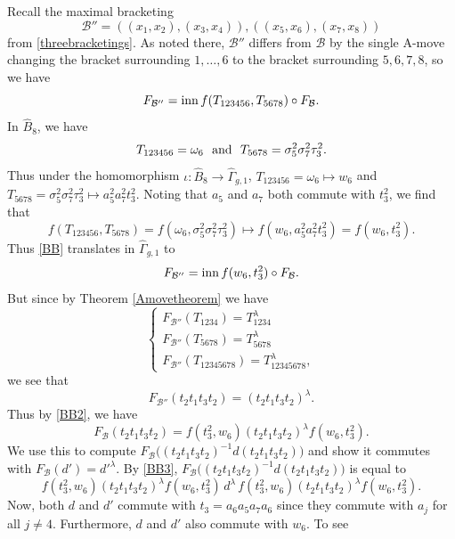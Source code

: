 \documentclass[a4paper,10pt,reqno]{amsart}
\newcommand\B{\widehat{B}}
\newcommand\GGone{\widehat{\Gamma}_{g,1}}
\begin{document}
Recall the maximal bracketing
$${\mathcal{B}''}=((x_1,x_2),(x_3,x_4)),((x_5,x_6),(x_7,x_8))$$
from \eqref{threebracketings}. As noted there, ${\mathcal{B}''}$ differs from
${\mathcal{B}}$ by the single A-move changing the bracket surrounding $1,\ldots,6$ to the
bracket surrounding $5,6,7,8$, so we have
\begin{equation}\label{BB}
F_{\mathcal{B}''}={\rm inn}\,f(T_{123456},T_{5678})\circ F_{\mathcal{B}}.
\end{equation}
In $\B_8$, we have
$$T_{123456}=\omega_6\ \ {\rm and}\ \ T_{5678}=\sigma_5^2\sigma_7^2\tau_3^2.$$
Thus under the homomorphism $\iota:\B_8\rightarrow \GGone$, 
$T_{123456}=\omega_6\mapsto w_6$ and $T_{5678}=\sigma_5^2\sigma_7^2\tau_3^2\mapsto 
a_5^2a_7^2t_3^2$. Noting that $a_5$ and $a_7$ both commute with $t_3^2$, we find that
$$f(T_{123456},T_{5678})=f(\omega_6,\sigma_5^2\sigma_7^2\tau_3^2)\mapsto
f(w_6,a_5^2a_7^2t_3^2)=f(w_6,t_3^2).$$
Thus \eqref{BB} translates in $\GGone$ to
\begin{equation}\label{BB2}
F_{\mathcal{B}''}={\rm inn}\,f(w_6,t_3^2)\circ F_{\mathcal{B}}.
\end{equation}
But since by Theorem \ref{Amovetheorem} we have
\begin{equation*}
\begin{cases}
F_{\mathcal{B}''}(T_{1234})=T_{1234}^\lambda\\
F_{\mathcal{B}''}(T_{5678})=T_{5678}^\lambda\\
F_{\mathcal{B}''}(T_{12345678})=T_{12345678}^\lambda,
\end{cases}
\end{equation*}
we see that 
$$F_{\mathcal{B}''}(t_2t_1t_3t_2)=(t_2t_1t_3t_2)^\lambda.$$
Thus by \eqref{BB2}, we have
\begin{equation}\label{BB3}
F_{\mathcal{B}}(t_2t_1t_3t_2)=f(t_3^2,w_6)(t_2t_1t_3t_2)^\lambda f(w_6,t_3^2).
\end{equation}
We use this to compute $F_{\mathcal{B}}\bigl((t_2t_1t_3t_2)^{-1}d(t_2t_1t_3t_2)\bigr)$ and show 
it commutes with $F_{\mathcal{B}}(d')={d'}^\lambda$.  
By \eqref{BB3}, 
$F_{\mathcal{B}}\bigl((t_2t_1t_3t_2)^{-1}d(t_2t_1t_3t_2)\bigr)$ 
is equal to
\begin{equation}\label{BB4}
f(t_3^2,w_6)(t_2t_1t_3t_2)^\lambda f(w_6,t_3^2)\,d^\lambda\,f(t_3^2,w_6)(t_2t_1t_3t_2)^\lambda f(w_6,t_3^2).
\end{equation}
Now, both $d$ and $d'$ commute with $t_3=a_6a_5a_7a_6$ since they commute with $a_j$ for all $j\ne 4$. 
Furthermore, $d$ and $d'$ also commute with $w_6$. To see
\end{document}
